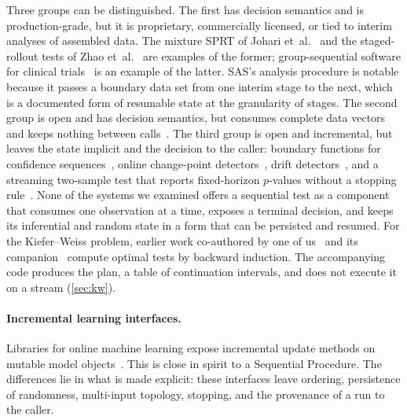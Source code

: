 \documentclass[11pt,a4paper]{article}
\theoremstyle{definition}
\theoremstyle{remark}
\begin{document}
Three groups can be distinguished. The first has decision semantics and
is production-grade, but it is proprietary, commercially licensed, or
tied to interim analyses of assembled data. The mixture SPRT of Johari
et~al.~\cite{johari2017,johari2022} and the staged-rollout tests of Zhao
et~al.~\cite{zhao2019} are examples of the former; group-sequential
software for clinical trials~\cite{sas,rpact,wassmer2025} is an example
of the latter. SAS's analysis procedure is notable because it passes a
boundary data set from one interim stage to the next, which is a
documented form of resumable state at the granularity of stages. The
second group is open and has decision semantics, but consumes complete
data vectors and keeps nothing between
calls~\cite{schnuerch2020,pramanik2021,grunwald2024}. The third group is
open and incremental, but leaves the state implicit and the decision to
the caller: boundary functions for confidence
sequences~\cite{howard2021}, online change-point
detectors~\cite{romano2026}, drift detectors~\cite{montiel2021}, and a
streaming two-sample test that reports fixed-horizon $p$-values without
a stopping rule~\cite{spark}. None of the systems we examined offers a
sequential test as a component that consumes one observation at a time,
exposes a terminal decision, and keeps its inferential and random state
in a form that can be persisted and resumed. For the Kiefer--Weiss
problem, earlier work co-authored by one of
us~\cite{novikov2022a,novikov2023} and its
companion~\cite{novikov2022b} compute optimal tests by backward
induction. The accompanying code produces the plan, a table of
continuation intervals, and does not execute it on a stream
(\cref{sec:kw}).

\paragraph{Incremental learning interfaces.}
Libraries for online machine learning expose incremental update methods
on mutable model objects~\cite{bifet2010,buitinck2013,montiel2021,%
day2020}. This is close in spirit to a Sequential Procedure. The
differences lie in what is made explicit: these interfaces leave
ordering, persistence of randomness, multi-input topology, stopping, and
the provenance of a run to the caller.
\end{document}
